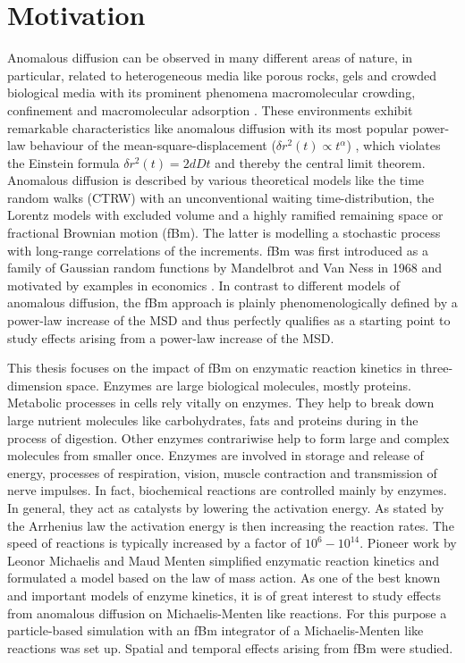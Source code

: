 \documentclass[
  a4paper,BCOR10mm,twoside,
  headsepline,footsepline,%
  fleqn,openbib
]{scrbook}
\begin{document}
\chapter*{Motivation}
Anomalous diffusion can be observed in many different areas of nature, in particular, related to heterogeneous media like porous rocks, gels and crowded biological media with its prominent phenomena macromolecular crowding, confinement and macromolecular adsorption \cite{Minton2006}. These environments exhibit remarkable characteristics like anomalous diffusion with its most popular power-law behaviour of the mean-square-displacement ($\delta r^2(t)\propto t^{\alpha}$) \cite{Hofling2013}, which violates the Einstein formula $\delta r^2(t)=2 d D t$ and thereby the central limit theorem. Anomalous diffusion is described by various theoretical models like the time random walks (CTRW) with an unconventional waiting time-distribution, the Lorentz models with excluded volume and a highly ramified remaining space  or fractional Brownian motion (fBm). The latter is modelling a stochastic process with long-range correlations of the increments. fBm was first introduced as a family of Gaussian random functions by Mandelbrot and Van Ness in 1968 and motivated by examples in economics \cite{Mandelbrot1968}. In contrast to different models of anomalous diffusion, the fBm approach is plainly phenomenologically defined by a power-law increase of the MSD and thus perfectly qualifies as a starting point to study effects arising from a power-law increase of the MSD. \par This thesis focuses on the impact of fBm on enzymatic reaction kinetics in three-dimension space. Enzymes are large biological molecules, mostly proteins. Metabolic processes in cells rely vitally on enzymes. They help to break down large nutrient molecules like carbohydrates, fats and proteins during in the process of digestion. Other enzymes contrariwise help to form large and complex molecules from smaller once. Enzymes are involved in storage and release of energy, processes of respiration, vision, muscle contraction and transmission of nerve impulses. In fact, biochemical reactions are controlled mainly by enzymes. In general, they act as catalysts by lowering the activation energy. As stated by the Arrhenius law the activation energy is then increasing the reaction rates. The speed of reactions is typically increased by a factor of $10^6-10^{14}$. Pioneer work by Leonor Michaelis and Maud Menten \cite{michaelis1913kinetik} simplified enzymatic reaction kinetics and formulated a model based on the law of mass action. As one of the best known and important models of enzyme kinetics, it is of great interest to study effects from anomalous diffusion on Michaelis-Menten like reactions. For this purpose a particle-based simulation with an fBm integrator of a Michaelis-Menten like reactions was set up. Spatial and temporal effects arising from fBm were studied. 
\end{document}
